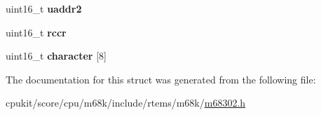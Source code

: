 \begin{DoxyCompactItemize}
\mbox{\label{structm302__SCC__UartSpecific__t_a46885fccdbc382fc848d8d633ced598a}} 
uint16\+\_\+t {\bfseries uaddr2}
\item 
\mbox{\label{structm302__SCC__UartSpecific__t_a8205a9ded497f201186285787e4842ca}} 
uint16\+\_\+t {\bfseries rccr}
\item 
\mbox{\label{structm302__SCC__UartSpecific__t_af7625986642e9238edb673002c449852}} 
uint16\+\_\+t {\bfseries character} \mbox{[}8\mbox{]}
\end{DoxyCompactItemize}


The documentation for this struct was generated from the following file\+:\begin{DoxyCompactItemize}
\item 
cpukit/score/cpu/m68k/include/rtems/m68k/\mbox{\hyperlink{m68302_8h}{m68302.\+h}}\end{DoxyCompactItemize}
